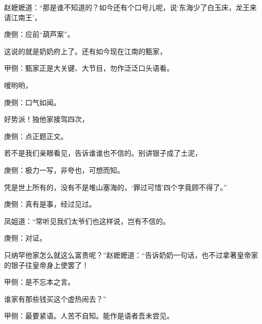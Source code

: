 \begin{parag}
    赵嬷嬷道：“那是谁不知道的？如今还有个口号儿呢，说‘东海少了白玉床，龙王来请江南王’，\begin{note}庚侧：应前“葫芦案”。\end{note}这说的就是奶奶府上了。还有如今现在江南的甄家，\begin{note}甲侧：甄家正是大关键、大节目，勿作泛泛口头语看。\end{note}嗳哟哟，\begin{note}庚侧：口气如闻。\end{note}好势派！独他家接驾四次，\begin{note}庚侧：点正题正文。\end{note}若不是我们亲眼看见，告诉谁谁也不信的。别讲银子成了土泥，\begin{note}庚侧：极力一写，非夸也，可想而知。\end{note}凭是世上所有的，没有不是堆山塞海的，‘罪过可惜’四个字竟顾不得了。”\begin{note}庚侧：真有是事，经过见过。\end{note}凤姐道：“常听见我们太爷们也这样说，岂有不信的。\begin{note}庚侧：对证。\end{note}只纳罕他家怎么就这么富贵呢？”赵嬷嬷道：“告诉奶奶一句话，也不过拿著皇帝家的银子往皇帝身上使罢了！\begin{note}甲侧：是不忘本之言。\end{note}谁家有那些钱买这个虚热闹去？”\begin{note}甲侧：最要紧语。人苦不自知。能作是语者吾未尝见。\end{note}
\end{parag}


